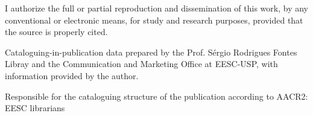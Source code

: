 \documentclass{apaThesis}
\begin{document}
\cleardoublepage
\thispagestyle{empty}
\vspace*{\fill}
\begin{center}
I authorize the full or partial reproduction and dissemination of this work, by any conventional or electronic means, for study and research purposes, provided that the source is properly cited.

\vspace{1cm}

Cataloguing-in-publication data prepared by the Prof. Sérgio Rodrigues Fontes Libray and the Communication and Marketing Office at EESC-USP, with information provided by the author. 

\vspace{5mm}
\noindent{}
\vspace{5mm}

Responsible for the cataloguing structure of the publication according to AACR2: EESC librarians
\end{center}
\newpage

\begin{judgepage}\end{judgepage}

	
\end{document}
